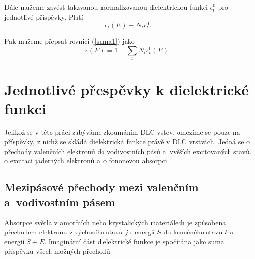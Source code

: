 Dále můžeme zavést takzvanou normalizovanou dielektrickou funkci $\epsilon_t^0$ pro jednotlivé příspěvky. Platí 
\begin{equation}
\epsilon_t(E) = N_t \epsilon_t^0  \text{.}
\end{equation}

Pak můžeme přepsat rovnici (\ref{suma1}) jako
\begin{equation}
\epsilon (E) = 1 + \sum_t N_t \epsilon_t^0(E) \text{.}
\end{equation}




\section{Jednotlivé přespěvky k dielektrické funkci}
Jelikož se v této práci zabýváme zkoumáním DLC vstev, omezíme se pouze na příspěvky, z nichž se skládá dielektrická funkce právě v DLC vrstvách. Jedná se o přechody valenčních elektronů do vodivostních pásů a~vyšších excitovaných stavů, o excitaci jaderných elektronů a~o fononovou absorpci. 

\subsection{Mezipásové přechody mezi valenčním a~vodivostním pásem}
Absorpce světla v amorfních nebo krystalických materiálech je způsobena přechodem elektronu z výchozího stavu $j$ s energií $S$ do konečného stavu $k$ s energií $S + E$. Imaginární část dielektrické funkce je spočítána jako suma příspěvků všech možných přechodů

